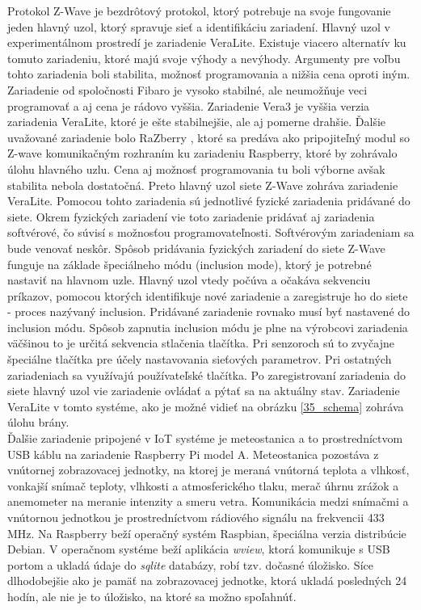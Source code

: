 \indent Protokol Z-Wave je bezdrôtový protokol, ktorý potrebuje na svoje fungovanie jeden hlavný uzol, ktorý spravuje sieť a identifikáciu zariadení. Hlavný uzol v experimentálnom prostredí je zariadenie VeraLite. Existuje viacero alternatív ku tomuto zariadeniu, ktoré majú svoje výhody a nevýhody. Argumenty pre voľbu tohto zariadenia boli stabilita, možnosť programovania a nižšia cena oproti iným. Zariadenie od spoločnosti Fibaro \cite{IOT25} je vysoko stabilné, ale neumožňuje veci programovať a aj cena je rádovo vyššia. Zariadenie Vera3 \cite{IOT27} je vyššia verzia zariadenia VeraLite, ktoré je ešte stabilnejšie, ale aj pomerne drahšie. Ďalšie uvažované zariadenie bolo RaZberry \cite{IOT26}, ktoré sa predáva ako pripojiteľný modul so Z-wave komunikačným rozhraním ku zariadeniu Raspberry, ktoré by zohrávalo úlohu hlavného uzlu. Cena aj možnosť programovania tu boli výborne avšak stabilita nebola dostatočná. Preto hlavný uzol siete Z-Wave zohráva zariadenie VeraLite. Pomocou tohto zariadenia sú jednotlivé fyzické zariadenia pridávané do siete. Okrem fyzických zariadení vie toto zariadenie pridávať aj zariadenia softvérové, čo súvisí s možnosťou programovateľnosti. Softvérovým zariadeniam sa bude venovať neskôr. Spôsob pridávania fyzických zariadení do siete Z-Wave funguje na základe špeciálneho módu (inclusion mode), ktorý je potrebné nastaviť na hlavnom uzle. Hlavný uzol vtedy počúva a očakáva sekvenciu príkazov, pomocou ktorých identifikuje nové zariadenie a zaregistruje ho do siete - proces nazývaný inclusion. Pridávané zariadenie rovnako musí byť nastavené do inclusion módu. Spôsob zapnutia inclusion módu je plne na výrobcovi zariadenia väčšinou to je určitá sekvencia stlačenia tlačítka. Pri senzoroch sú to zvyčajne špeciálne tlačítka pre účely nastavovania sieťových parametrov. Pri ostatných zariadeniach sa využívajú používateľské tlačítka. Po zaregistrovaní zariadenia do siete hlavný uzol vie zariadenie ovládať a pýtať sa na aktuálny stav. Zariadenie VeraLite v tomto systéme, ako je možné vidieť na obrázku \ref{35_schema} zohráva úlohu brány. \\
\indent Ďalšie zariadenie pripojené v IoT systéme je meteostanica a to prostredníctvom USB káblu na zariadenie Raspberry Pi model A. Meteostanica pozostáva z vnútornej zobrazovacej jednotky, na ktorej je meraná vnútorná teplota a vlhkosť, vonkajší snímač teploty, vlhkosti a atmosferického tlaku,  merač úhrnu zrážok a anemometer na meranie intenzity a smeru vetra. Komunikácia medzi snímačmi a vnútornou jednotkou je prostredníctvom rádiového signálu na frekvencii 433 MHz. Na Raspberry beží operačný systém Raspbian, špeciálna verzia distribúcie Debian. V operačnom systéme beží aplikácia \textit{wview}, ktorá komunikuje s USB portom a ukladá údaje do \textit{sqlite} databázy, robí tzv. dočasné úložisko. Síce dlhodobejšie ako je pamäť na zobrazovacej jednotke, ktorá ukladá posledných 24 hodín, ale nie je to úložisko, na ktoré sa možno spoľahnúť.  
